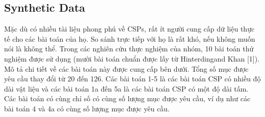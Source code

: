 \documentclass[a4paper]{article}
\begin{document}
\subsection{Synthetic Data}
\indent\indent Mặc dù có nhiều tài liệu phong phú về CSPs, rất ít người cung cấp dữ liệu thực tế cho các bài toán của họ. So sánh trực tiếp với họ là rất khó, nếu không muốn nói là không thể. Trong các nghiên cứu thực nghiệm của nhóm, 10 bài toán thử nghiệm được sử dụng (mười bài toán chuẩn được lấy từ Hinterdingand Khan [1]). Mô tả chi tiết về các bài toán này được cung cấp bên dưới. Tổng số mục được yêu cầu thay đổi từ 20 đến 126. Các bài toán 1-5 là các bài toán CSP có nhiều độ dài vật liệu và các bài toán 1a đến 5a là các bài toán CSP có một độ dài tấm. Các bài toán có cùng chỉ số có cùng số lượng mục được yêu cầu, ví dụ như các bài toán 4 và 4a có cùng số lượng mục được yêu cầu.
\end{document}
